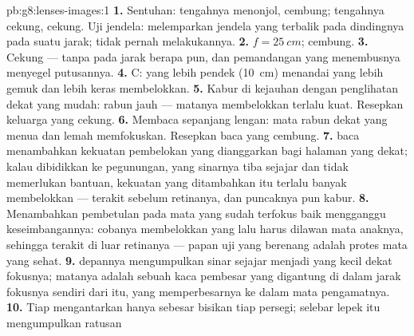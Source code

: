 \begin{solution}{pb:g8:lenses-images:1}
\textbf{1.} Sentuhan: tengahnya menonjol, cembung; tengahnya
cekung, cekung. Uji jendela:  melemparkan jendela yang
terbalik pada dindingnya pada suatu jarak;  tidak pernah
melakukannya.
\textbf{2.} $f = \qty{25}{cm}$; cembung.
\textbf{3.} Cekung --- tanpa  pada jarak berapa pun, dan
pemandangan yang  menembusnya menyegel putusannya.
\textbf{4.} C:  yang lebih pendek (\qty{10}{cm}) menandai
 yang lebih gemuk dan lebih keras membelokkan.
\textbf{5.} Kabur di kejauhan dengan penglihatan dekat yang mudah:
rabun jauh --- matanya membelokkan terlalu kuat. Resepkan keluarga
yang cekung.
\textbf{6.} Membaca sepanjang lengan: mata rabun dekat yang menua dan
lemah memfokuskan. Resepkan  baca yang cembung.
\textbf{7.}  baca menambahkan kekuatan pembelokan yang
dianggarkan bagi halaman yang dekat; kalau dibidikkan ke pegunungan,
yang sinarnya tiba sejajar dan tidak memerlukan bantuan, kekuatan yang
ditambahkan itu terlalu banyak membelokkan ---  terakit
sebelum retinanya, dan puncaknya pun kabur.
\textbf{8.} Menambahkan pembetulan pada mata yang sudah terfokus baik
mengganggu keseimbangannya:  cobanya membelokkan  yang lalu
harus dilawan mata anaknya, sehingga  terakit di luar
retinanya --- papan uji yang berenang adalah protes mata yang sehat.
\textbf{9.}  depannya mengumpulkan sinar sejajar 
menjadi  yang kecil dekat fokusnya;  matanya adalah
sebuah kaca pembesar yang digantung di dalam jarak fokusnya sendiri
dari  itu, yang memperbesarnya ke dalam mata pengamatnya.
\textbf{10.} Tiap  mengantarkan  hanya sebesar bisikan
tiap  persegi;  selebar lepek itu mengumpulkan ratusan

\end{solution}
